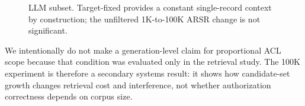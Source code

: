 \begin{figure}[t]
\centering
{}
\caption{LLM subset. Target-fixed provides a constant single-record context by construction; the unfiltered 1K-to-100K ARSR change is not significant.}
\label{fig:scale_llm}
\end{figure}

We intentionally do not make a generation-level claim for proportional ACL scope because that condition was evaluated only in the retrieval study. The 100K experiment is therefore a secondary systems result: it shows how candidate-set growth changes retrieval cost and interference, not whether authorization correctness depends on corpus size.
